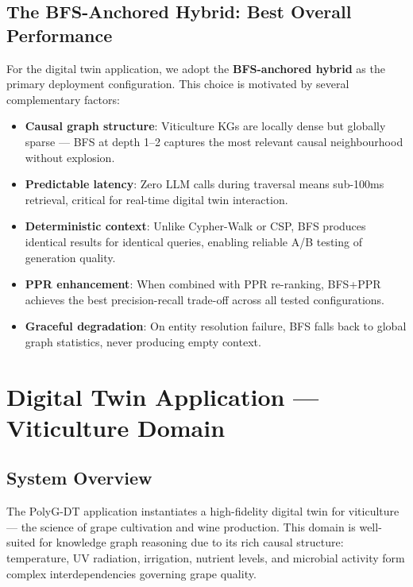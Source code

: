 \documentclass[12pt,a4paper]{article}
\begin{document}
\subsection{The BFS-Anchored Hybrid: Best Overall Performance}

For the digital twin application, we adopt the \textbf{BFS-anchored hybrid}
as the primary deployment configuration. This choice is motivated by several
complementary factors:

\begin{insightbox}
\begin{itemize}[leftmargin=*]
  \item \textbf{Causal graph structure}: Viticulture KGs are locally dense
    but globally sparse — BFS at depth 1--2 captures the most relevant
    causal neighbourhood without explosion.
  \item \textbf{Predictable latency}: Zero LLM calls during traversal means
    sub-100ms retrieval, critical for real-time digital twin interaction.
  \item \textbf{Deterministic context}: Unlike Cypher-Walk or CSP, BFS
    produces identical results for identical queries, enabling reliable
    A/B testing of generation quality.
  \item \textbf{PPR enhancement}: When combined with PPR re-ranking,
    BFS+PPR achieves the best precision-recall trade-off across all
    tested configurations.
  \item \textbf{Graceful degradation}: On entity resolution failure,
    BFS falls back to global graph statistics, never producing empty
    context.
\end{itemize}
\end{insightbox}

\section{Digital Twin Application — Viticulture Domain}

\subsection{System Overview}

The PolyG-DT application instantiates a high-fidelity digital twin for
viticulture — the science of grape cultivation and wine production. This
domain is well-suited for knowledge graph reasoning due to its rich causal
structure: temperature, UV radiation, irrigation, nutrient levels, and
microbial activity form complex interdependencies governing grape quality.
\end{document}
